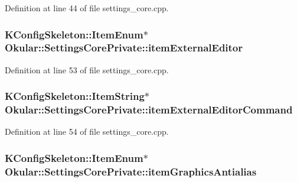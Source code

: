 Definition at line 44 of file settings\+\_\+core.\+cpp.

\hypertarget{classOkular_1_1SettingsCorePrivate_aae0212ef7eab85cc329d71fcb28c16fe}{
\subsubsection[{item\+External\+Editor}]{\setlength{\rightskip}{0pt plus 5cm}K\+Config\+Skeleton\+::\+Item\+Enum$\ast$ Okular\+::\+Settings\+Core\+Private\+::item\+External\+Editor}}\label{classOkular_1_1SettingsCorePrivate_aae0212ef7eab85cc329d71fcb28c16fe}


Definition at line 53 of file settings\+\_\+core.\+cpp.

\hypertarget{classOkular_1_1SettingsCorePrivate_a469d8f43886ab0df9650865b68dd911f}{
\subsubsection[{item\+External\+Editor\+Command}]{\setlength{\rightskip}{0pt plus 5cm}K\+Config\+Skeleton\+::\+Item\+String$\ast$ Okular\+::\+Settings\+Core\+Private\+::item\+External\+Editor\+Command}}\label{classOkular_1_1SettingsCorePrivate_a469d8f43886ab0df9650865b68dd911f}


Definition at line 54 of file settings\+\_\+core.\+cpp.

\hypertarget{classOkular_1_1SettingsCorePrivate_adcf521e8a4539ff836c4f48c5a09a472}{
\subsubsection[{item\+Graphics\+Antialias}]{\setlength{\rightskip}{0pt plus 5cm}K\+Config\+Skeleton\+::\+Item\+Enum$\ast$ Okular\+::\+Settings\+Core\+Private\+::item\+Graphics\+Antialias}}\label{classOkular_1_1SettingsCorePrivate_adcf521e8a4539ff836c4f48c5a09a472}


